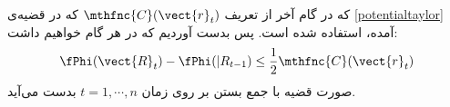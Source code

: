 که در گام آخر از تعریف 
$\mthfnc{C} (\vect{r}_t)$ 
که در قضیه‌ی
\ref{potentialtaylor} 
آمده، استفاده شده است. پس بدست آوردیم که در هر گام خواهیم داشت:
\[
\fPhi (\vect{R}_{t}) - \fPhi (\vert{R}_{t-1}) \leq \frac{1}{2} \mthfnc{C} (\vect{r}_t)
\]
صورت قضیه با جمع بستن بر روی زمان 
$t = 1, \cdots, n$ 
بدست می‌آید.


























